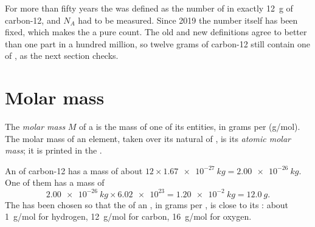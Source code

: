 \begin{remark}\label{rem:g10:the-mole:origin}
For more than fifty years the  was defined as the number of  in
exactly \qty{12}{g} of carbon-12, and $N_A$ had to be measured. Since
2019 the number itself has been fixed, which makes the  a pure count.
The old and new definitions agree to better than one part in a
hundred million, so twelve grams of carbon-12 still contain one  of
, as the next section checks.
\end{remark}

\section{Molar mass}

\begin{definition}\label{def:g10:the-mole:molar-mass}
The \emph{molar mass} $M$ of a  is the
mass of one  of its entities, in grams per  (\si{g/mol}). The
molar mass of an element, taken over its natural  of , is
its \emph{atomic molar mass}; it is printed in
the .
\end{definition}

\begin{example}\label{ex:g10:the-mole:carbon}
An  of carbon-12 has a mass of about
$12 \times \qty{1.67e-27}{kg} = \qty{2.00e-26}{kg}$. One  of them
has a mass of
\[
  \qty{2.00e-26}{kg} \times \num{6.02e23} = \qty{1.20e-2}{kg}
  = \qty{12.0}{g}.
\]
The  has been chosen so that the  of an , in grams per
, is close to its : about \qty{1}{g/mol} for hydrogen,
\qty{12}{g/mol} for carbon, \qty{16}{g/mol} for oxygen.
\end{example}

